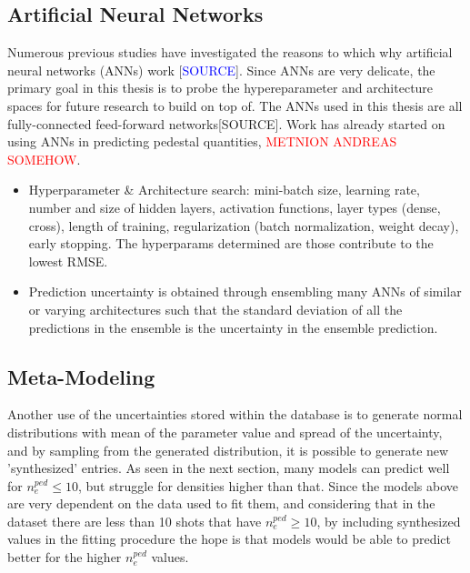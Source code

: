 \documentclass[a4paper, twoside, final, 12pt]{article}
\begin{document}
\subsection{Artificial Neural Networks}

Numerous previous studies have investigated the reasons to which why artificial neural networks (ANNs) work [\textcolor{blue}{SOURCE}].
Since ANNs are very delicate, the primary goal in this thesis is to probe the hypereparameter and architecture spaces for future research to build on top of.
The ANNs used in this thesis are all fully-connected feed-forward networks[SOURCE].
Work has already started on using ANNs in predicting pedestal quantities, \textcolor{red}{METNION ANDREAS SOMEHOW}.
\begin{itemize}
	\item Hyperparameter \& Architecture search: mini-batch size, learning rate,  number and size of hidden layers, activation functions, layer types (dense, cross), length of training, regularization (batch normalization, weight decay), early stopping. The hyperparams determined are those contribute to the lowest RMSE.
	\item Prediction uncertainty is obtained through ensembling many ANNs of similar or varying architectures such that the standard deviation of all the predictions in the ensemble is the uncertainty in the ensemble prediction.
\end{itemize}



\subsection{Meta-Modeling}
Another use of the uncertainties stored within the database is to generate normal distributions with mean of the parameter value and spread of the uncertainty, and by sampling from the generated distribution, it is possible to generate new 'synthesized' entries.
As seen in the next section, many models can predict well for $n_e^{ped} \leq 10$, but struggle for densities higher than that.
Since the models above are very dependent on the data used to fit them, and considering that in the dataset there are less than 10 shots that have $n_e^{ped} \geq 10$, by including synthesized values in the fitting procedure the hope is that models would be able to predict better for the higher $n_e^{ped}$ values.
\end{document}
